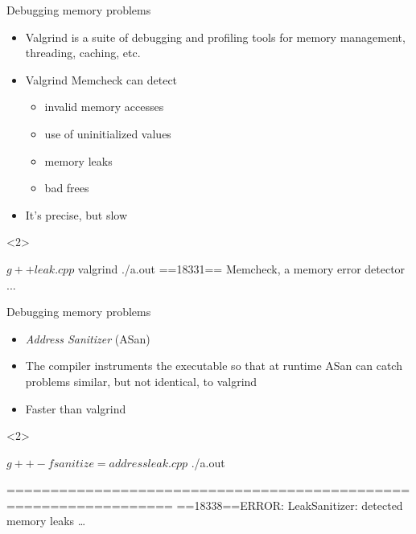 \begin{frame}[fragile]{Debugging memory problems}

  \begin{itemize}
  \item Valgrind is a suite of debugging and profiling tools for memory
    management, threading, caching, etc.
  \item Valgrind Memcheck can detect
    \begin{itemize}
    \item invalid memory accesses
    \item use of uninitialized values
    \item memory leaks
    \item bad frees
    \end{itemize}
  \item It's precise, but slow
  \end{itemize}

  \begin{onlyenv}<2>
    \begin{codeblock}
$ g++ leak.cpp
$ valgrind ./a.out
==18331== Memcheck, a memory error detector
...\end{codeblock}
  \end{onlyenv}

\end{frame}

\begin{frame}[fragile]{Debugging memory problems \insertcontinuationtext}

  \begin{itemize}
  \item \textit{Address Sanitizer} (ASan)
  \item The compiler instruments the executable so that at runtime ASan can
    catch problems similar, but not identical, to valgrind
  \item Faster than valgrind
  \end{itemize}

  \begin{onlyenv}<2>
    \begin{codeblock}
$ g++ -fsanitize=address leak.cpp
$ ./a.out

=================================================================
==18338==ERROR: LeakSanitizer: detected memory leaks
\ldots\end{codeblock}
  \end{onlyenv}

\end{frame}


